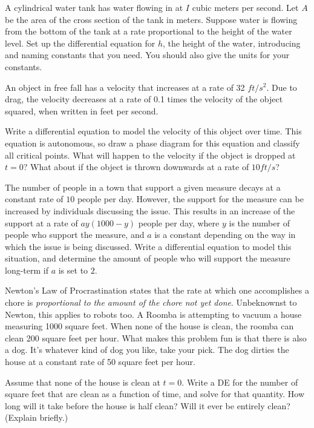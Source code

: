 \begin{exercise}\ansMark%
A cylindrical water tank has water flowing in at $I$ cubic meters
per second.
Let $A$ be the area of the cross section of the tank in meters.
Suppose water is
flowing from the bottom of the tank at a rate proportional to the height of
the water level.  Set up the differential equation for $h$, the height of the
water, introducing and naming
constants that you need.  You should also give the units for your constants.
\end{exercise}

\begin{exercise}
An object in free fall has a velocity that increases at a rate of 32 $ft/s^2$. Due to drag, the velocity decreases at a rate of 0.1 times the velocity of the object squared, when written in feet per second. 
\begin{tasks}
\task Write a differential equation to model the velocity of this object over time.
\task This equation is autonomous, so draw a phase diagram for this equation and classify all critical points.
\task What will happen to the velocity if the object is dropped at $t=0$? What about if the object is thrown downwards at a rate of $10 ft/s$?
\end{tasks}
\end{exercise}

\begin{exercise}
The number of people in a town that support a given measure decays at a constant rate of $10$ people per day. However, the support for the measure can be increased by individuals discussing the issue. This results in an increase of the support at a rate of $ay(1000 - y)$ people per day, where $y$ is the number of people who support the measure, and $a$ is a constant depending on the way in which the issue is being discussed. Write a differential equation to model this situation, and determine the amount of people who will support the measure long-term if $a$ is set to $2$.  
\end{exercise}

\begin{exercise}
Newton's Law of Procrastination states that the rate at which one accomplishes a chore is {\it proportional to the amount of the chore not yet done}. Unbeknownst to Newton, this applies to robots too. A Roomba is attempting to vacuum a house measuring 1000 square feet. When none of the house is clean, the roomba can clean 200 square feet per hour. What makes this problem fun is that there is also a dog. It's whatever kind of dog you like, take your pick. The dog dirties the house at a constant rate of 50 square feet per hour.
\begin{tasks}
\task Assume that none of the house is clean at $t=0$. Write a DE for  the number of square feet that are clean as a function of time, and solve for that quantity.
\task How long will it take before the house is half clean? Will it ever be entirely clean? (Explain briefly.)
\end{tasks}
\end{exercise}

